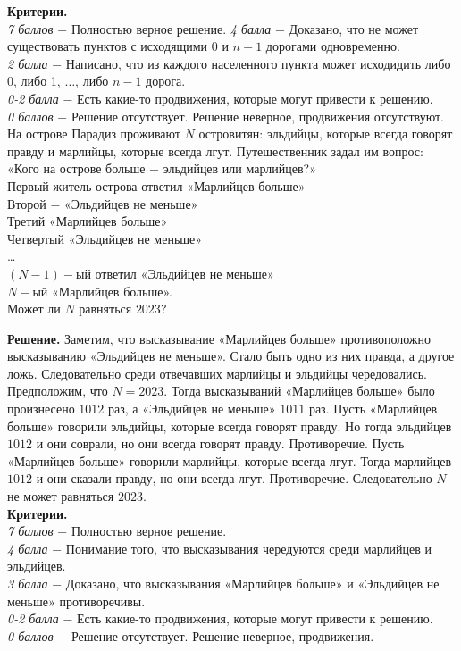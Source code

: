 \textbf{Критерии.} \\
\textit{7 баллов} $-$ Полностью верное решение. \newpage
\textit{4 балла} $-$ Доказано, что не может существовать пунктов с исходящими 0 и $n-1$ дорогами одновременно.\\ 
\textit{2 балла} $-$ Написано, что из каждого населенного пункта может исходидить либо 0, либо 1, $\dotsc$, либо $n-1$ дорога. \\
\textit{0-2 балла} $-$ Есть какие-то продвижения, которые могут привести к решению. \\ 
\textit{0 баллов} $-$ Решение отсутствует. Решение неверное, продвижения отсутствуют. \\ 

 На острове Парадиз проживают $N$ островитян: эльдийцы, которые всегда говорят правду и марлийцы, которые всегда лгут. Путешественник задал им вопрос: «Кого на острове больше $-$ эльдийцев или марлийцев?» \\
Первый житель острова ответил «Марлийцев больше» \\ 
Второй $-$ «Эльдийцев не меньше» \\
Третий «Марлийцев больше» \\
Четвертый «Эльдийцев не меньше» \\
… \\
$(N-1)-$ый ответил «Эльдийцев не меньше» \\
$N-$ый «Марлийцев больше». \\
Может ли $N$ равняться $2023$? \par

\textbf{Решение.} Заметим, что высказывание «Марлийцев больше» противоположно высказыванию «Эльдийцев не меньше». Стало быть одно из них правда, а другое ложь. Следовательно среди отвечавших марлийцы и эльдийцы чередовались. Предположим, что $N = 2023$. Тогда высказываний «Марлийцев больше» было произнесено $1012$ раз, а «Эльдийцев не меньше» $1011$ раз. Пусть «Марлийцев больше» говорили эльдийцы, которые всегда говорят правду. Но тогда эльдийцев $1012$ и они соврали, но они всегда говорят правду. Противоречие. Пусть «Марлийцев больше» говорили марлийцы, которые всегда лгут. Тогда марлийцев $1012$ и они сказали правду, но они всегда лгут. Противоречие. Следовательно $N$ не может равняться $2023$. \\

\textbf{Критерии.} \\
\textit{7 баллов} $-$ Полностью верное решение.\\ 
\textit{4 балла} $-$ Понимание того, что высказывания чередуются среди марлийцев и эльдийцев.\\
\textit{3 балла} $-$ Доказано, что высказывания «Марлийцев больше» и «Эльдийцев не меньше» противоречивы.\\
\textit{0-2 балла} $-$ Есть какие-то продвижения, которые могут привести к решению. \\
\textit{0 баллов} $-$ Решение отсутствует. Решение неверное, продвижения.\\

